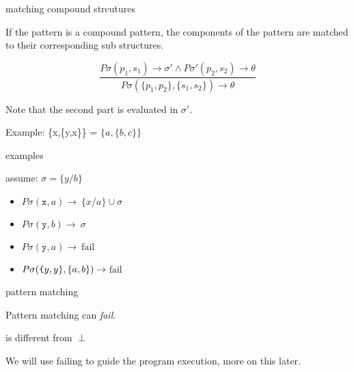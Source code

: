 \begin{frame}{matching compound strcutures}

If the pattern is a compound pattern, \pause the components of the pattern are matched to their corresponding sub structures.

\pause\vspace{10pt}

$$\frac{P\sigma(p_1, s_1) \rightarrow \sigma' \wedge P\sigma'(p_2, s_2) \rightarrow \theta}{P\sigma(\lbrace p_1, p_2 \rbrace  , \lbrace s_1, s_2 \rbrace) \rightarrow \theta}$$


\pause \vspace{10pt}
Note that the second part is evaluated in $\sigma'$. 

\pause \vspace{10pt}Example: \{x,\{y,x\}\} = $\{a, \{b,c\}\}$

\vspace{20pt}{\em Match a compund pattern with anyting but a compound structure will fail.}

\end{frame}

\begin{frame}{examples}

assume: $\sigma = \lbrace y/b\rbrace$

\begin{itemize}
  \pause\item $P\sigma({\texttt x} , a) \rightarrow $\pause $\ \lbrace x/a \rbrace  \cup \sigma$
  \pause\item $P\sigma({\texttt y} , b) \rightarrow $\pause $\ \sigma$
  \pause\item $P\sigma({\texttt y} , a) \rightarrow $\pause  $\ \mathrm{fail}$
  \pause\item $P\sigma({\texttt \{ y, y\}} , \lbrace a, b \rbrace) \rightarrow $\pause $\ \mathrm{fail}$
\end{itemize}

\end{frame}

\begin{frame}{pattern matching}

\pause Pattern matching can {\em fail}. 

\pause\vspace{20pt}{\em fail} is different from $\perp$

We will use failing to guide the program execution, more on this later.

\end{frame}

